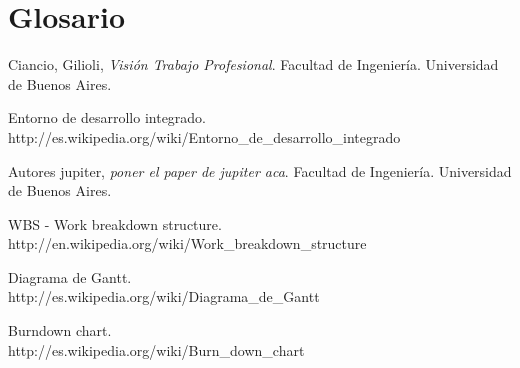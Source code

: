 \documentclass[12pt,a4paper]{article}
\begin{document}
	\section{Glosario}

\newpage
\begin{thebibliography}{9}
	Ciancio, Gilioli,
	\emph{Visión Trabajo Profesional}.
	Facultad de Ingeniería.
	Universidad de Buenos Aires. 

	Entorno de desarrollo integrado. \\
	http://es.wikipedia.org/wiki/Entorno\_de\_desarrollo\_integrado

	Autores jupiter,
	\emph{poner el paper de jupiter aca}.
	Facultad de Ingeniería.
	Universidad de Buenos Aires.

	WBS - Work breakdown structure. \\
	http://en.wikipedia.org/wiki/Work\_breakdown\_structure

	Diagrama de Gantt. \\
	http://es.wikipedia.org/wiki/Diagrama\_de\_Gantt

	Burndown chart. \\
	http://es.wikipedia.org/wiki/Burn\_down\_chart

\end{thebibliography}
\end{document}
